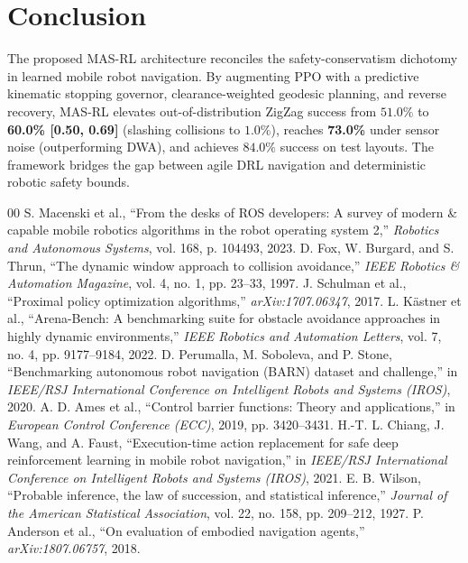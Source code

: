 \documentclass[conference]{IEEEtran}
\begin{document}
\section{Conclusion}
The proposed MAS-RL architecture reconciles the safety-conservatism dichotomy in learned mobile robot navigation. By augmenting PPO with a predictive kinematic stopping governor, clearance-weighted geodesic planning, and reverse recovery, MAS-RL elevates out-of-distribution ZigZag success from $51.0\%$ to \textbf{60.0\% [0.50, 0.69]} (slashing collisions to $1.0\%$), reaches \textbf{73.0\%} under sensor noise (outperforming DWA), and achieves $84.0\%$ success on test layouts. The framework bridges the gap between agile DRL navigation and deterministic robotic safety bounds.


\begin{thebibliography}{00}
 S. Macenski et al., ``From the desks of ROS developers: A survey of modern \& capable mobile robotics algorithms in the robot operating system 2,'' \textit{Robotics and Autonomous Systems}, vol. 168, p. 104493, 2023.
 D. Fox, W. Burgard, and S. Thrun, ``The dynamic window approach to collision avoidance,'' \textit{IEEE Robotics \& Automation Magazine}, vol. 4, no. 1, pp. 23--33, 1997.
 J. Schulman et al., ``Proximal policy optimization algorithms,'' \textit{arXiv:1707.06347}, 2017.
 L. K{\"a}stner et al., ``Arena-Bench: A benchmarking suite for obstacle avoidance approaches in highly dynamic environments,'' \textit{IEEE Robotics and Automation Letters}, vol. 7, no. 4, pp. 9177--9184, 2022.
 D. Perumalla, M. Soboleva, and P. Stone, ``Benchmarking autonomous robot navigation (BARN) dataset and challenge,'' in \textit{IEEE/RSJ International Conference on Intelligent Robots and Systems (IROS)}, 2020.
 A. D. Ames et al., ``Control barrier functions: Theory and applications,'' in \textit{European Control Conference (ECC)}, 2019, pp. 3420--3431.
 H.-T. L. Chiang, J. Wang, and A. Faust, ``Execution-time action replacement for safe deep reinforcement learning in mobile robot navigation,'' in \textit{IEEE/RSJ International Conference on Intelligent Robots and Systems (IROS)}, 2021.
 E. B. Wilson, ``Probable inference, the law of succession, and statistical inference,'' \textit{Journal of the American Statistical Association}, vol. 22, no. 158, pp. 209--212, 1927.
 P. Anderson et al., ``On evaluation of embodied navigation agents,'' \textit{arXiv:1807.06757}, 2018.
\end{thebibliography}
\end{document}
